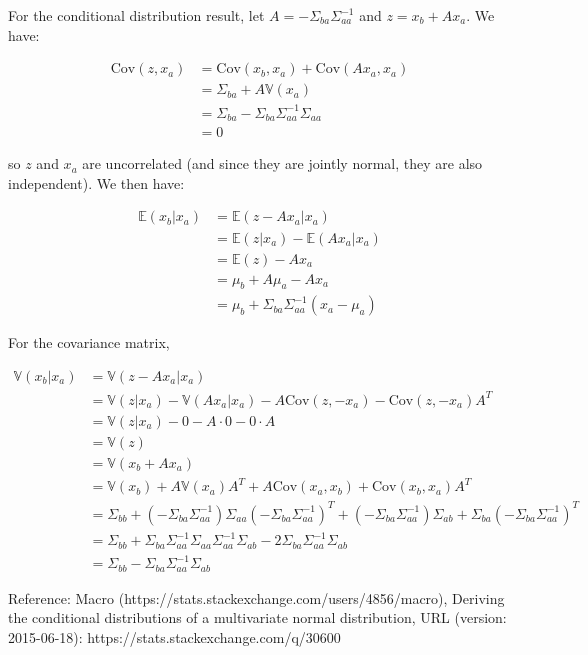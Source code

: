 For the conditional distribution result, let
\(A = -\Sigma_{ba} \Sigma_{aa}^{-1}\) and \(z = x_b + A x_a\). We have:

\[\begin{align}
\text{Cov}(z, x_a) &= \text{Cov}(x_b, x_a) + \text{Cov}(A x_a, x_a) \\
&= \Sigma_{ba} + A \mathbb{V}(x_a) \\
&= \Sigma_{ba} - \Sigma_{ba} \Sigma_{aa}^{-1} \Sigma_{aa} \\
&= 0
\end{align}\]

so \(z\) and \(x_a\) are uncorrelated (and since they are jointly
normal, they are also independent). We then have:

\[\begin{align}
\mathbb{E}(x_b | x_a) &= \mathbb{E}(z - A x_a | x_a) \\
&= \mathbb{E}(z | x_a) - \mathbb{E}(A x_a | x_a) \\
&= \mathbb{E}(z) - A x_a \\
&= \mu_b + A \mu_a - A x_a \\
&= \mu_b + \Sigma_{ba} \Sigma_{aa}^{-1} (x_a - \mu_a)
\end{align}\]

For the covariance matrix,

\[\begin{align}
\mathbb{V}(x_b | x_a) &= \mathbb{V}(z - A x_a | x_a) \\
&= \mathbb{V}(z | x_a) - \mathbb{V}(A x_a | x_a) - A \text{Cov}(z, -x_a) - \text{Cov}(z, -x_a) A^T \\
&= \mathbb{V}(z | x_a) - 0 - A \cdot 0 - 0 \cdot A \\
&= \mathbb{V}(z) \\
&= \mathbb{V}(x_b + A x_a) \\
&= \mathbb{V}(x_b) + A \mathbb{V}(x_a) A^T + A \text{Cov}(x_a, x_b) + \text{Cov}(x_b, x_a) A^T \\
&= \Sigma_{bb} + (- \Sigma_{ba} \Sigma_{aa}^{-1}) \Sigma_{aa} (- \Sigma_{ba} \Sigma_{aa}^{-1})^T + (- \Sigma_{ba} \Sigma_{aa}^{-1}) \Sigma_{ab} + \Sigma_{ba} (- \Sigma_{ba} \Sigma_{aa}^{-1})^T \\
&= \Sigma_{bb} + \Sigma_{ba} \Sigma_{aa}^{-1} \Sigma_{aa} \Sigma_{aa}^{-1} \Sigma_{ab} - 2 \Sigma_{ba}\Sigma_{aa}^{-1}\Sigma_{ab} \\
&= \Sigma_{bb} - \Sigma_{ba}\Sigma_{aa}^{-1}\Sigma_{ab}
\end{align}\]

Reference: Macro (https://stats.stackexchange.com/users/4856/macro),
Deriving the conditional distributions of a multivariate normal
distribution, URL (version: 2015-06-18):
https://stats.stackexchange.com/q/30600

